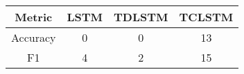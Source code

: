 \begin{tabular}{|c|c|c|c|}
    \hline
    Metric & LSTM & TDLSTM & TCLSTM  \\
    \hline
    Accuracy & 0 & 0 & 13  \\
    \hline
    F1 & 4 & 2 & 15  \\
    \hline
\end{tabular}